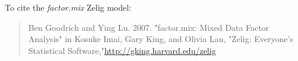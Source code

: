 To cite the \emph{ factor.mix } Zelig model:
 \begin{verse}
 Ben Goodrich and Ying Lu. 2007. "factor.mix: Mixed Data Factor Analysis" in Kosuke Imai, Gary King, and Olivia Lau, "Zelig: Everyone's Statistical Software,"\url{http://gking.harvard.edu/zelig} 
\end{verse}